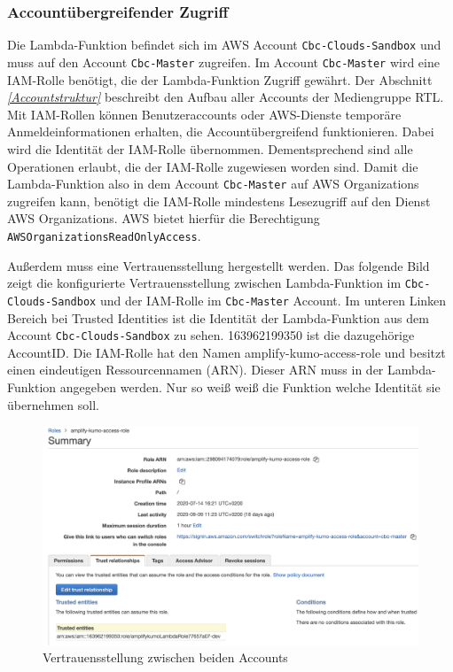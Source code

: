 \subsubsection{Accountübergreifender Zugriff}
\label{AccountübergreifenderZugriff}
Die Lambda-Funktion befindet sich im AWS Account \verb+Cbc-Clouds-Sandbox+ und muss auf den Account \verb+Cbc-Master+ zugreifen.
Im Account \verb+Cbc-Master+ wird eine IAM-Rolle benötigt, die der Lambda-Funktion Zugriff gewährt.
Der Abschnitt  \textit{\ref{Accountstruktur} } beschreibt den Aufbau aller Accounts der Mediengruppe RTL.
Mit IAM-Rollen können Benutzeraccounts oder AWS-Dienste temporäre Anmeldeinformationen erhalten, die Accountübergreifend funktionieren.
Dabei wird die Identität der IAM-Rolle übernommen.
Dementsprechend sind alle Operationen erlaubt, die der IAM-Rolle zugewiesen worden sind.
Damit die Lambda-Funktion also in dem Account \verb+Cbc-Master+ auf AWS Organizations zugreifen kann, benötigt die IAM-Rolle mindestens Lesezugriff auf den Dienst AWS Organizations.
AWS bietet hierfür die Berechtigung \verb+AWSOrganizationsReadOnlyAccess+.

Außerdem muss eine Vertrauensstellung hergestellt werden.
Das folgende Bild zeigt die konfigurierte Vertrauensstellung zwischen Lambda-Funktion im \verb+Cbc-Clouds-Sandbox+ und der IAM-Rolle im \verb+Cbc-Master+ Account.
Im unteren Linken Bereich bei \glqq Trusted Identities\grqq{} ist die Identität der Lambda-Funktion aus dem Account \verb+Cbc-Clouds-Sandbox+ zu sehen.
163962199350 ist die dazugehörige AccountID.
Die IAM-Rolle hat den Namen \grqq amplify-kumo-access-role\grqq{} und besitzt einen eindeutigen Ressourcennamen (ARN).
Dieser ARN muss in der Lambda-Funktion angegeben werden. Nur so weiß weiß die Funktion welche Identität sie übernehmen soll.

\clearpage

\begin{figure}[htbp]
    \centering
    \includegraphics[width=1.0\textwidth]{50-Implementierung/IAM-Rolle.png}
    \caption{Vertrauensstellung zwischen beiden Accounts}
    \label{fig:meine-grafik}
\end{figure}


